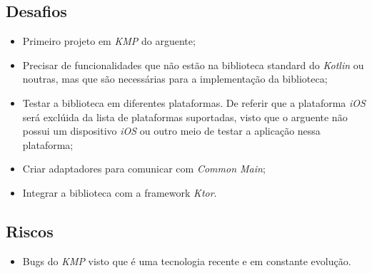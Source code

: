 \subsection{Desafios}\label{subsec:desafios}
\begin{itemize}[topsep=0pt,itemsep=0pt,partopsep=0pt, parsep=0pt]
    \item Primeiro projeto em \textit{KMP} do arguente;
    \item Precisar de funcionalidades que não estão na biblioteca standard do \textit{Kotlin} ou noutras, mas que são necessárias para a implementação da biblioteca;
    \item Testar a biblioteca em diferentes plataformas.
    De referir que a plataforma \textit{iOS} será exclúida da lista de plataformas suportadas, visto que o arguente não possui um dispositivo \textit{iOS} ou outro meio de
    testar a aplicação nessa plataforma;
    \item Criar adaptadores para comunicar com \textit{Common Main};
    \item Integrar a biblioteca com a framework \textit{Ktor}.
\end{itemize}

\subsection{Riscos}\label{subsec:riscos}
\begin{itemize}[topsep=0pt,itemsep=0pt,partopsep=0pt, parsep=0pt]
    \item Bugs do \textit{KMP} visto que é uma tecnologia recente e em constante evolução.
\end{itemize}

